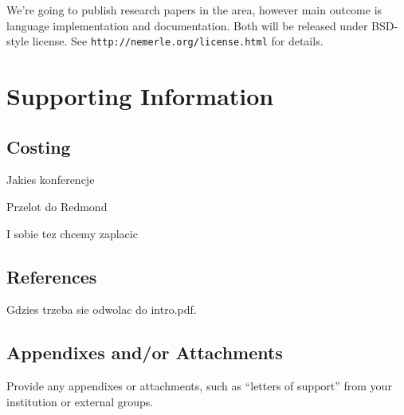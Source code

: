 \documentclass[a4paper,11pt]{article}
\begin{document}
We're going to publish research papers in the area, however main outcome
is language implementation and documentation. Both will be released
under BSD-style license. See \texttt{http://nemerle.org/license.html}
for details.


\section{Supporting Information}


\subsection{Costing}

Jakies konferencje

Przelot do Redmond

I sobie tez chcemy zaplacic


\subsection{References}

Gdzies trzeba sie odwolac do intro.pdf.


\subsection{Appendixes and/or Attachments}

Provide any appendixes or attachments, such as ``letters of support''
from your institution or external groups.
\end{document}
